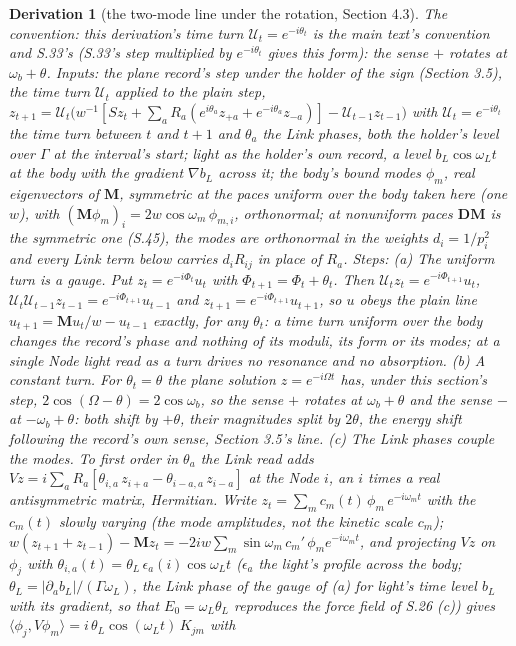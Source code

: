 \documentclass[pdflatex,sn-mathphys-num]{sn-jnl}
\theoremstyle{thmstyleone}
\newtheorem{derivation}{Derivation}
\begin{document}
\begin{derivation}[the two-mode line under the rotation, Section 4.3]
\emph{The convention:} this derivation's time turn $\mathcal U_t = e^{-i\theta_t}$ is the main text's convention and S.33's (S.33's step multiplied by $e^{-i\theta_t}$ gives this form): the sense $+$ rotates at $\omega_b + \theta$. \emph{Inputs:} the plane record's step under the holder of the sign (Section 3.5), the time turn $\mathcal U_t$ applied to the plain step, $z_{t+1} = \mathcal U_t\bigl(w^{-1}[S z_t + \sum_a R_a(e^{i\theta_a}z_{+a} + e^{-i\theta_a}z_{-a})] - \mathcal U_{t-1}z_{t-1}\bigr)$ with $\mathcal U_t = e^{-i\theta_t}$ the time turn between $t$ and $t+1$ and $\theta_a$ the Link phases, both the holder's level over $\Gamma$ at the interval's start; light as the holder's own record, a level $b_L\cos\omega_L t$ at the body with the gradient $\nabla b_L$ across it; the body's bound modes $\phi_m$, real eigenvectors of $\mathbf M$, symmetric at the paces uniform over the body taken here (one $w$), with $(\mathbf M\phi_m)_i = 2w\cos\omega_m\,\phi_{m,i}$, orthonormal; at nonuniform paces $\mathbf D\mathbf M$ is the symmetric one (S.45), the modes are orthonormal in the weights $d_i = 1 / p_i^2$ and every Link term below carries $d_i R_{ij}$ in place of $R_a$. \emph{Steps:} (a) \emph{The uniform turn is a gauge.} Put $z_t = e^{-i\Phi_t}u_t$ with $\Phi_{t+1} = \Phi_t + \theta_t$. Then $\mathcal U_t z_t = e^{-i\Phi_{t+1}}u_t$, $\mathcal U_t \mathcal U_{t-1} z_{t-1} = e^{-i\Phi_{t+1}}u_{t-1}$ and $z_{t+1} = e^{-i\Phi_{t+1}}u_{t+1}$, so $u$ obeys the plain line $u_{t+1} = \mathbf M u_t / w - u_{t-1}$ exactly, for any $\theta_t$: a time turn uniform over the body changes the record's phase and nothing of its moduli, its form or its modes; at a single Node light read as a turn drives no resonance and no absorption. (b) \emph{A constant turn.} For $\theta_t = \theta$ the plane solution $z = e^{-i\Omega t}$ has, under this section's step, $2\cos(\Omega - \theta) = 2\cos\omega_b$, so the sense $+$ rotates at $\omega_b + \theta$ and the sense $-$ at $-\omega_b + \theta$: both shift by $+\theta$, their magnitudes split by $2\theta$, the energy shift following the record's own sense, Section 3.5's line. (c) \emph{The Link phases couple the modes.} To first order in $\theta_a$ the Link read adds $V z = i\sum_a R_a[\theta_{i,a}\,z_{i+a} - \theta_{i-a,a}\,z_{i-a}]$ at the Node $i$, an $i$ times a real antisymmetric matrix, Hermitian. Write $z_t = \sum_m c_m(t)\,\phi_m\,e^{-i\omega_m t}$ with the $c_m(t)$ slowly varying (the mode amplitudes, not the kinetic scale $c_m$); $w(z_{t+1} + z_{t-1}) - \mathbf M z_t = -2iw\sum_m\sin\omega_m\,c_m'\,\phi_m e^{-i\omega_m t}$, and projecting $V z$ on $\phi_j$ with $\theta_{i,a}(t) = \theta_L\,\epsilon_a(i)\cos\omega_L t$ ($\epsilon_a$ the light's profile across the body; $\theta_L = |\partial_a b_L| / (\Gamma\omega_L)$, the Link phase of the gauge of (a) for light's time level $b_L$ with its gradient, so that $E_0 = \omega_L\theta_L$ reproduces the force field of S.26 (c)) gives $\langle\phi_j, V\phi_m\rangle = i\,\theta_L\cos(\omega_L t)\,K_{jm}$ with

\end{derivation}
\end{document}
